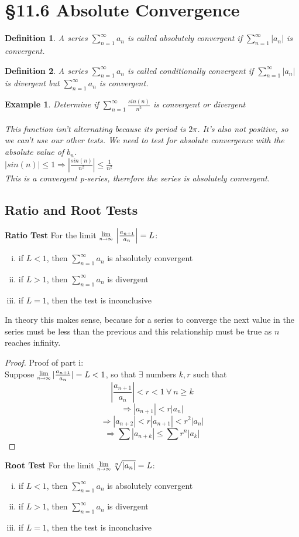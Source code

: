 \documentclass[12 pt]{article}
\newcommand{\Lim}[1]{\raisebox{0.5ex}{\scalebox{0.8}{$\displaystyle \lim_{#1}\;$}}}
\newcommand{\sumo}{\sum\limits_{n=1}^{\infty}}
\newcommand{\toinfty}{\rightarrow\infty}
\newtheorem*{exmp*}{Example}
\newtheorem*{def*}{Definition}
\begin{document}
	\section{\S 11.6 Absolute Convergence}
		\begin{def*}
			A series $\sumo a_n$ is called absolutely convergent if $\sumo\left|a_n\right|$ is convergent.
		\end{def*}
		\begin{def*}
			A series $\sumo a_n$ is called conditionally convergent if $\sumo\left|a_n\right|$ is divergent but $\sumo a_n$ is convergent.
		\end{def*}
		\begin{exmp*}
			Determine if $\sumo \frac{sin(n)}{n^2}$ is convergent or divergent\\\\
			This function isn't alternating because its period is $2\pi$. It's also not positive, so we can't use our other tests. We need to test for absolute convergence with the absolute value of $b_n$.\\
			$\left|sin(n)\right|\leq 1\Rightarrow \left|\frac{sin(n)}{n^2}\right|\leq \frac{1}{n^2}$\\
			This is a convergent p-series, therefore the series is absolutely convergent.
		\end{exmp*}
	\subsection{Ratio and Root Tests}
		\textbf{Ratio Test}
		For the limit $\Lim{n\toinfty}\left|\frac{a_{n+1}}{a_n}\right|=L$:
		\begin{enumerate}[i)]
			\item if $L<1$, then $\sumo a_n$ is absolutely convergent
			\item if $L>1$, then $\sumo a_n$ is divergent
			\item if $L=1$, then the test is inconclusive
		\end{enumerate}
		In theory this makes sense, because for a series to converge the next value in the series must be less than the previous and this relationship must be true as $n$ reaches infinity.
		\begin{proof}
			Proof of part i:\\
			Suppose $\Lim{n\toinfty} \lvert \frac{a_{n+1}}{a_n} \rvert=L<1$, so that $\exists$ numbers $k,r$ such that
			$$\left|\frac{a_{n+1}}{a_n}\right|<r<1\ \forall\ n\geq k$$
			$$\Rightarrow \left|a_{n+1}\right|<r\left|a_n\right|$$
			$$\Rightarrow \left|a_{n+2}\right|<r\left|a_{n+1}\right|<r^2\left|a_n\right|$$
			$$\Rightarrow \sum\left|a_{n+k}\right|\leq\sum r^n\left|{a_k}\right|$$
		\end{proof}
		\textbf{Root Test}
		For the limit $\Lim{n\toinfty}\sqrt[n]{\lvert a_n\rvert}=L$:
		\begin{enumerate}[i)]
			\item if $L<1$, then $\sumo a_n$ is absolutely convergent
			\item if $L>1$, then $\sumo a_n$ is divergent
			\item if $L=1$, then the test is inconclusive
		\end{enumerate}
\end{document}
